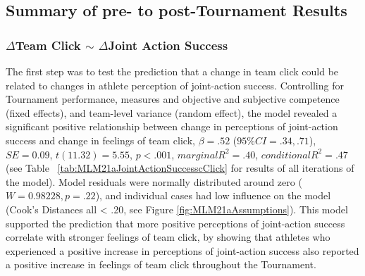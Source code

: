 \documentclass[12pt]{report}
\begin{document}
{%


\clearpage

\subsection{Summary of pre- to post-Tournament Results}





\subsubsection{$\Delta$Team Click $\sim$ $\Delta$Joint Action Success}

The first step was to test the prediction that a change in team click could be related to changes in athlete perception of joint-action success. Controlling for Tournament performance, measures and objective and subjective competence (fixed effects), and team-level variance (random effect), the model revealed a significant positive relationship between change in perceptions of joint-action success and change in feelings of team click, $\beta = .52$ ($95\% CI =  .34, .71$), $SE = 0.09$, $t(11.32) = 5.55$, $p < .001$, $marginal R^2 = .40$, $conditional R^2 = .47$ (see Table ~\ref{tab:MLM21aJointActionSuccesscClick} for results of all iterations of the model).  Model residuals were normally distributed around zero ($W = 0.98228, p = .22$), and individual cases had low influence on the model (Cook's Distances all < .20, see Figure \ref{fig:MLM21aAssumptions}).  This model supported the prediction that more positive perceptions of joint-action success correlate with stronger feelings of team click, by showing that athletes who experienced a positive increase in perceptions of joint-action success also reported a positive increase in feelings of team click throughout the Tournament.

}
\end{document}
